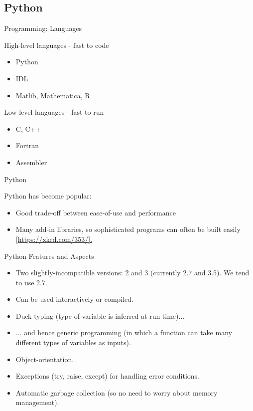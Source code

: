 \documentclass{beamer}
\begin{document}
\subsection{Python}


\begin{frame}{Programming: Languages}
  \begin{block}{High-level languages - fast to code}
    \begin{itemize}
      \item Python
      \item IDL
      \item Matlib, Mathematica, R
    \end{itemize}
    \end{block}
    \begin{block}{Low-level languages - fast to run}
    \begin{itemize}
      \item C, C++
      \item Fortran
      \item Assembler
    \end{itemize}
  \end{block}
\end{frame}

\begin{frame}{Python}
  \begin{block}{Python has become popular:}
    \begin{itemize}
      \item Good trade-off between ease-of-use and performance
      \item Many add-in libraries, so sophisticated programs can often be built easily [\url{https://xkcd.com/353/].}
    \end{itemize}
  \end{block}
\end{frame}

\begin{frame}{Python Features and Aspects}
  \begin{itemize}
    \item Two slightly-incompatible versions: 2 and 3 (currently 2.7 and 3.5). We tend to use 2.7.
    \item Can be used interactively or compiled.
    \item Duck typing (type of variable is inferred at run-time)...
    \item ... and hence generic programming (in which a function can take many different types of variables as inputs).
    \item Object-orientation.
    \item Exceptions (try, raise, except) for handling error conditions.
    \item Automatic garbage collection (so no need to worry about memory management).
  \end{itemize}
\end{frame}
\end{document}
